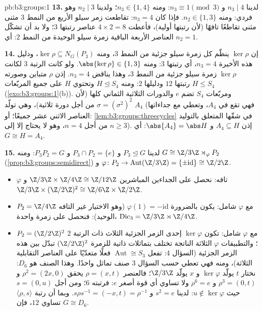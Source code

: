 \begin{solution}{pb:b3:groups:1}
\textbf{13.} لدينا $n_3 \mid 4$ و $n_3 \equiv 1 \pmod 3$: ومنه $n_3 \in \{1,
4\}$؛ ولدينا
$n_2 \mid 3$ وهو فردي: ومنه $n_2 \in \{1, 3\}$. فإذا كان $n_3 = 4$: تقاطعت
زمر سيلو الأربع من النمط $3$ مثنى مثنى تقاطعًا تافهًا (لأن
رتبتها أولية)، فأعطت $4 \times 2 = 8$ عناصر رتبتها $3$؛ ولا بد
أن تشكّل العناصر الأربعة الباقية زمرة سيلو الوحيدة من النمط $2$:
أي $n_2 = 1$.

\textbf{14.} إن $\ker\rho$ ينظّم كل زمرة سيلو جزئية من النمط $3$،
ومنه $\ker \rho \subseteq N_G(P_3)$، ودليل هذه الأخيرة $n_3 = 4$، أي رتبتها $3$: ومنه
$\abs{\ker\rho} \in \{1, 3\}$. ولو كانت الرتبة $3$ لكانت $\ker\rho$ زمرة سيلو جزئية
\emph{} من النمط $3$، وهذا يناقض $n_3
= 4$. إذن $\rho$
متباين وصورته $H \leq S_4$ رتبتها $12$ ودليلها $2$: ومنه $H \trianglelefteq S_4$
وتحتوي $H$ على جميع المربّعات (\cref{exo:b3:groups:1}(b)). ومربّعات $S_4$
تضم $e$ والدورات الثلاثية الثماني كلها (لأن $\sigma = (\sigma^2)^2$ من أجل دورة
ثلاثية)، وهي تولّد $A_4$ (فهي تقع في $A_4$، وتعطي مع جداءاتها
العناصر الاثني عشر جميعًا؛ أو: \cref{lem:b3:groups:threecycles} في شقّها المتعلق
بالتوليد من أجل $n = 4$، وهو لا يحتاج إلا إلى $n \geq 3$). إذن
$A_4 \subseteq H$ و $\abs{A_4}
= \abs H$: أي $G \cong H = A_4$.

\textbf{15.} لدينا $P_3 \trianglelefteq G$ و $P_3 \cap P_2 = \{e\}$ و $P_3P_2 = G$: ومنه
$G \cong \Z/3\Z \rtimes_\varphi P_2$ (\cref{prop:b3:groups:semidirect}) و $\varphi \colon P_2 \to
\operatorname{Aut}(\Z/3\Z) = \{\pm\mathrm{id}\} \cong \Z/2\Z$.
\begin{itemize}
  \item $\varphi$ تافه: نحصل على الجداءين المباشرين $\Z/3\Z \times \Z/4\Z
        \cong \Z/12\Z$
        و $\Z/3\Z \times (\Z/2\Z)^2 \cong \Z/6\Z
        \times \Z/2\Z$.
  \item $P_2 = \Z/4\Z$ مع $\varphi$ شامل: يكون بالضرورة $\varphi(1) = -\mathrm{id}$
        (وهو الاختيار غير التافه الوحيد): فنحصل على زمرة واحدة،
        $\mathrm{Dic}_3 = \Z/3\Z \rtimes \Z/4\Z$.
  \item $P_2 = (\Z/2\Z)^2$ مع $\varphi$ شامل: تكون $\ker\varphi$ إحدى الزمر
        الجزئية الثلاث ذات الرتبة $2$؛ والتطبيقات $\varphi$
        الثلاثة الناتجة تختلف بتماثلات ذاتية للزمرة $(\Z/2\Z)^2$
        تبدّل بين هذه الزمر الجزئية (السؤال 4: تفعل $\operatorname{Aut}
        \cong S_3$
        فعلًا متعدّيًا على العناصر التقابلية الثلاثة)، ومنه فهي
        تعطي حسب السؤال 3 صنف تماثل واحدًا. وهذا الصنف هو $D_6$:
        نختار $t$ يولّد $\ker\varphi$ و $x$ يولّد $\Z/3\Z$؛
        فالعنصر $\rho = (x, t)$ يحقق $\rho^2 = (2x, 0)$ و $\rho^3 = (0, t)$ و
        $\rho^6 = e$ ولا تساوي أي قوة أصغر $e$: فرتبته $6$؛
        ومن أجل $s = (0, u)$ حيث $u
        \notin \ker\varphi$: لدينا $s^2 = e$
        و $s\rho s^{-1} = (-x, t)
        = \rho^{-1}$. وبما أن رتبة $\langle \rho, s\rangle$ تساوي $12$، فإن
        $G \cong D_6$.
\end{itemize}


\end{solution}
